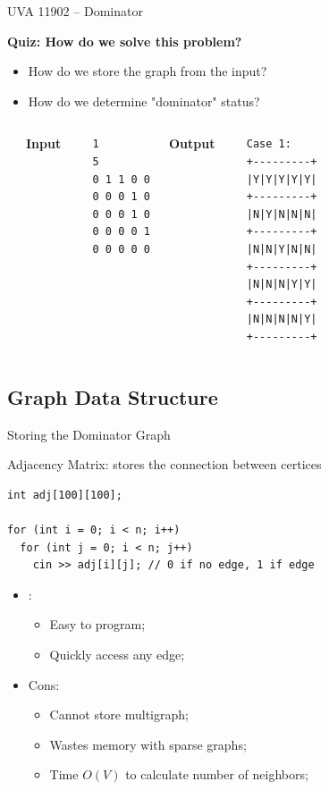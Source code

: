 \begin{frame}[fragile]{UVA 11902 -- Dominator}
  \begin{block}{{\bf Quiz: How do we solve this problem?}}
    \begin{itemize}
      \item How do we store the graph from the input?
      \item How do we determine "dominator" status?
    \end{itemize}
  \end{block}
  \begin{columns}[T]
      \begin{center}
        
      \end{center}
        {\bf Input}
  \begin{verbatim}
  1
  5
  0 1 1 0 0
  0 0 0 1 0
  0 0 0 1 0
  0 0 0 0 1
  0 0 0 0 0
  \end{verbatim}
  {\bf Output}
  {\smaller
  \begin{verbatim}
  Case 1:
  +---------+
  |Y|Y|Y|Y|Y|
  +---------+
  |N|Y|N|N|N|
  +---------+
  |N|N|Y|N|N|
  +---------+
  |N|N|N|Y|Y|
  +---------+
  |N|N|N|N|Y|
  +---------+
  \end{verbatim}}
    \end{columns}
\end{frame}

\subsection{Graph Data Structure}


\begin{frame}[fragile]{Storing the Dominator Graph}

\begin{block}{Adjacency Matrix: stores the connection between certices}
\begin{verbatim}
int adj[100][100];

for (int i = 0; i < n; i++)
  for (int j = 0; i < n; j++)
    cin >> adj[i][j]; // 0 if no edge, 1 if edge
\end{verbatim}

  \begin{itemize}
    \item {}:
    \begin{itemize}
      \item Easy to program;
      \item Quickly access any edge;
    \end{itemize}
    \item \alert{Cons}:
      \begin{itemize}
      \item Cannot store multigraph;
      \item Wastes memory with sparse graphs;
      \item Time $O(V)$ to calculate number of neighbors;
      \end{itemize}
    \end{itemize}
  \end{block}
\end{frame}

